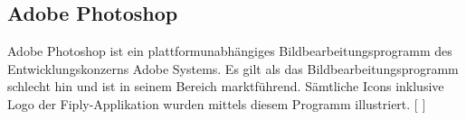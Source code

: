 \documentclass[FIPLY_base.tex]{subfiles}
\begin{document}
	\subsection{Adobe Photoshop}
	Adobe Photoshop ist ein plattformunabhängiges Bildbearbeitungsprogramm des Entwicklungskonzerns Adobe Systems. Es gilt als das Bildbearbeitungsprogramm schlecht hin und ist in seinem Bereich marktführend. Sämtliche Icons inklusive Logo der Fiply-Applikation wurden mittels diesem Programm illustriert. 
	[ \cite{adobephoto}]  
\end{document}
